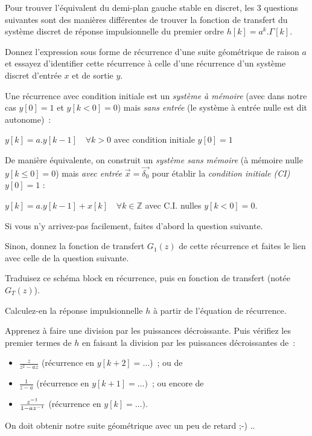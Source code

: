 Pour trouver l'équivalent du demi-plan gauche stable en discret, les 3 questions suivantes sont des
manières différentes de trouver la fonction de transfert du système
discret de réponse impulsionnelle du premier ordre $h[k]=a^k.\Gamma[k]$.



Donnez l'expression sous forme de récurrence d'une suite géométrique
de raison $a$ et essayez d'identifier cette récurrence à celle d'une
récurrence d'un système discret d'entrée $x$ et de sortie $y$.


\begin{remarque}
  Une récurrence avec condition initiale est un \emph{système à
    mémoire} (avec dans notre cas $y[0]=1$ et $y[k<0]=0$) mais
\emph{sans entrée} (le système à entrée nulle est dit autonome)~:
 
 $y[k]=a.y[k-1] \quad \forall k>0$ avec condition initiale $y[0]=1$

 De manière équivalente, on construit un \emph{système sans mémoire}
 (à mémoire nulle $y[k\leq 0]=0$) mais \emph{avec entrée}
 $\vec{x}=\vec{\delta_0}$ pour établir la \emph{condition initiale
   (CI)} $y[0]=1$ :
  
 $y[k]=a.y[k-1] + x[k] \quad \forall k\in\mathbb{Z}$ avec C.I. nulles
 $y[k<0]=0$.
 
 
\end{remarque}


Si vous n'y arrivez-pas facilement, faites d'abord la question suivante.

Sinon, donnez la fonction de transfert $G_1(z)$ de cette récurrence et
faites le lien avec celle de la question suivante.





Traduisez ce schéma block en récurrence, puis en fonction de transfert (notée $G_T(z)$).

Calculez-en la réponse impulsionnelle $h$ à partir de l'équation de récurrence.


\begin{remarque}
  
  Apprenez à faire une division par les puissances décroissante. Puis
  vérifiez les premier termes de $h$ en faisant la division par les
  puissances décroissantes de~:
\begin{itemize}
\item $\frac{z}{z^2-az}$ (récurrence en $y[k+2]=\dots$)~; ou de
\item $\frac{1}{z-a}$ (récurrence en $y[k+1]=\dots)$~; ou encore de
\item $\frac{z^{-1}}{1-az^{-1}}$ (récurrence en $y[k]=\dots)$.
\end{itemize}
\end{remarque}
On doit obtenir notre suite géométrique avec un peu de retard ;-) ..


